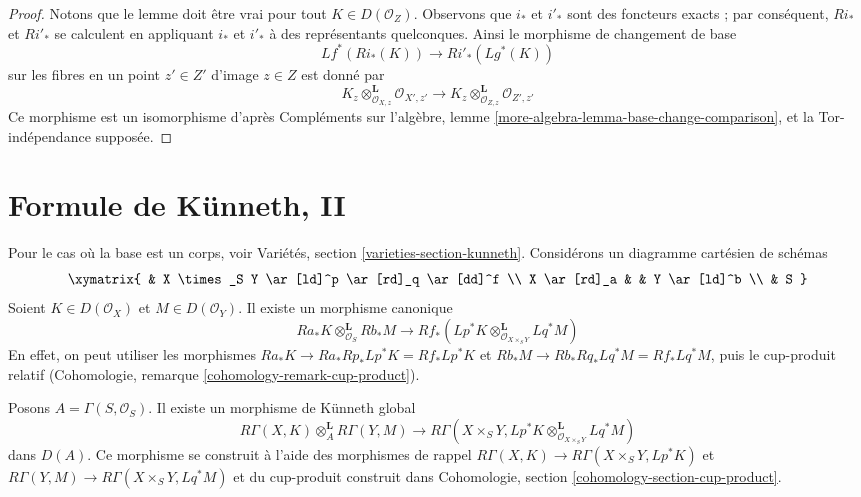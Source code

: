 \begin{proof}
Notons que le lemme doit être vrai pour tout $K \in D(\mathcal{O}_Z)$.
Observons que $i_*$ et $i'_*$ sont des foncteurs exacts ; par conséquent,
$Ri_*$ et $Ri'_*$ se calculent en appliquant $i_*$ et $i'_*$
à des représentants quelconques. Ainsi le morphisme de changement de base
$$
Lf^*(Ri_*(K)) \longrightarrow Ri'_*(Lg^*(K))
$$
sur les fibres en un point $z' \in Z'$ d'image $z \in Z$ est donné par
$$
K_z \otimes_{\mathcal{O}_{X, z}}^\mathbf{L} \mathcal{O}_{X', z'}
\longrightarrow
K_z \otimes_{\mathcal{O}_{Z, z}}^\mathbf{L} \mathcal{O}_{Z', z'}
$$
Ce morphisme est un isomorphisme d'après
Compléments sur l'algèbre, lemme \ref{more-algebra-lemma-base-change-comparison},
et la Tor-indépendance supposée.
\end{proof}








\section{Formule de K\"unneth, II}
\label{section-kunneth}

\noindent
Pour le cas où la base est un corps, voir
Variétés, section \ref{varieties-section-kunneth}.
Considérons un diagramme cartésien de schémas
$$
\xymatrix{
& X \times_S Y \ar[ld]^p \ar[rd]_q \ar[dd]^f \\
X \ar[rd]_a & & Y \ar[ld]^b \\
& S
}
$$
Soient $K \in D(\mathcal{O}_X)$ et $M \in D(\mathcal{O}_Y)$.
Il existe un morphisme canonique
\begin{equation}
\label{equation-kunneth}
Ra_*K \otimes_{\mathcal{O}_S}^\mathbf{L} Rb_*M
\longrightarrow
Rf_*(Lp^*K \otimes_{\mathcal{O}_{X \times_S Y}}^\mathbf{L} Lq^*M)
\end{equation}
En effet, on peut utiliser les morphismes
$Ra_*K \to Ra_*Rp_* Lp^*K = Rf_*Lp^*K$ et
$Rb_*M \to Rb_*Rq_* Lq^*M = Rf_*Lq^*M$, puis le cup-produit
relatif (Cohomologie, remarque \ref{cohomology-remark-cup-product}).

\medskip\noindent
Posons $A = \Gamma(S, \mathcal{O}_S)$. Il existe un morphisme de K\"unneth global
\begin{equation}
\label{equation-kunneth-global}
R\Gamma(X, K) \otimes_A^\mathbf{L} R\Gamma(Y, M)
\longrightarrow
R\Gamma(X \times_S Y,
Lp^*K \otimes_{\mathcal{O}_{X \times_S Y}}^\mathbf{L} Lq^*M)
\end{equation}
dans $D(A)$. Ce morphisme se construit à l'aide des morphismes de rappel
$R\Gamma(X, K) \to R\Gamma(X \times_S Y, Lp^*K)$ et
$R\Gamma(Y, M) \to R\Gamma(X \times_S Y, Lq^*M)$ et
du cup-produit construit dans
Cohomologie, section \ref{cohomology-section-cup-product}.

